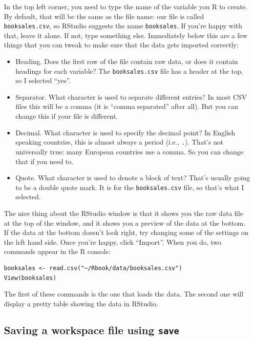 \documentclass[
]{book}
\providecommand{\tightlist}{%
  \setlength{\itemsep}{0pt}\setlength{\parskip}{0pt}}
\begin{document}
In the top left corner, you need to type the name of the variable you R to create. By default, that will be the same as the file name: our file is called \texttt{booksales.csv}, so RStudio suggests the name \texttt{booksales}. If you're happy with that, leave it alone. If not, type something else. Immediately below this are a few things that you can tweak to make sure that the data gets imported correctly:

\begin{itemize}
\tightlist
\item
  Heading. Does the first row of the file contain raw data, or does it contain headings for each variable? The \texttt{booksales.csv} file has a header at the top, so I selected ``yes''.
\item
  Separator. What character is used to separate different entries? In most CSV files this will be a comma (it is ``comma separated'' after all). But you can change this if your file is different.
\item
  Decimal. What character is used to specify the decimal point? In English speaking countries, this is almost always a period (i.e., \texttt{.}). That's not universally true: many European countries use a comma. So you can change that if you need to.
\item
  Quote. What character is used to denote a block of text? That's usually going to be a double quote mark. It is for the \texttt{booksales.csv} file, so that's what I selected.
\end{itemize}

The nice thing about the RStudio window is that it shows you the raw data file at the top of the window, and it shows you a preview of the data at the bottom. If the data at the bottom doesn't look right, try changing some of the settings on the left hand side. Once you're happy, click ``Import''. When you do, two commands appear in the R console:

\begin{verbatim}
booksales <- read.csv("~/Rbook/data/booksales.csv")
View(booksales)
\end{verbatim}

The first of these commands is the one that loads the data. The second one will display a pretty table showing the data in RStudio.

\hypertarget{saving-a-workspace-file-using-save}{%
\subsection{\texorpdfstring{Saving a workspace file using \texttt{save}}{Saving a workspace file using save}}\label{saving-a-workspace-file-using-save}}
\end{document}
